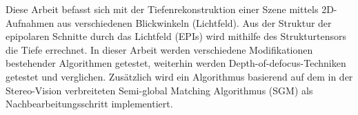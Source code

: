 
Diese Arbeit befasst sich mit der Tiefenrekonstruktion einer Szene mittels 2D-Aufnahmen aus verschiedenen Blickwinkeln (Lichtfeld). Aus der Struktur der epipolaren Schnitte durch das Lichtfeld (EPIs) wird mithilfe des Strukturtensors die Tiefe errechnet. In dieser Arbeit werden verschiedene Modifikationen bestehender Algorithmen getestet, weiterhin werden Depth-of-defocus-Techniken getestet und verglichen. Zusätzlich wird ein Algorithmus basierend auf dem in der Stereo-Vision verbreiteten Semi-global Matching Algorithmus (SGM) als Nachbearbeitungsschritt implementiert.